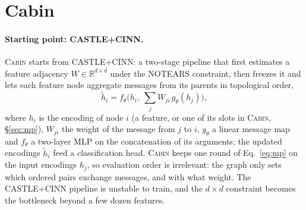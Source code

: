 \documentclass[anon,12pt]{clear2027} %
\newcommand{\Cabin}{\textsc{Cabin}}
\newcommand{\R}{\mathbb{R}}
\begin{document}
\section{Cabin}
\label{sec:method}

\paragraph{Starting point: CASTLE+CINN.}
\Cabin{} starts from CASTLE+CINN: a two-stage pipeline that first estimates a feature adjacency $W\in\R^{d\times d}$ under the NOTEARS constraint, then freezes it and lets each feature node aggregate messages from its parents in topological order,
\begin{equation}
\tilde h_i = f_\theta\Big(h_i,\ \textstyle\sum_{j} W_{ji}\, g_\theta(h_j)\Big),
\label{eq:mp}
\end{equation}
where $h_i$ is the encoding of node $i$ (a feature, or one of its slots in \Cabin{}, \S\ref{sec:mp}), $W_{ji}$ the weight of the message from $j$ to $i$, $g_\theta$ a linear message map and $f_\theta$ a two-layer MLP on the concatenation of its arguments; the updated encodings $\tilde h_i$ feed a classification head. \Cabin{} keeps one round of Eq.~\eqref{eq:mp} on the input encodings $h_j$, so evaluation order is irrelevant: the graph only sets which ordered pairs exchange messages, and with what weight. The CASTLE+CINN pipeline is unstable to train, and the $d\times d$ constraint becomes the bottleneck beyond a few dozen features.
\end{document}
